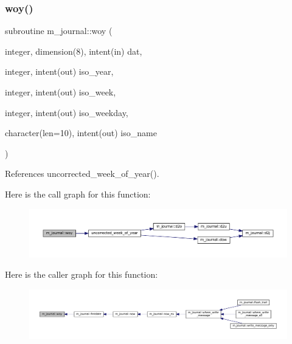 \subsubsection{\texorpdfstring{woy()}{woy()}}
{\footnotesize\ttfamily subroutine m\+\_\+journal\+::woy (\begin{DoxyParamCaption}\item[{integer, dimension(8), intent(in)}]{dat,  }\item[{integer, intent(out)}]{iso\+\_\+year,  }\item[{integer, intent(out)}]{iso\+\_\+week,  }\item[{integer, intent(out)}]{iso\+\_\+weekday,  }\item[{character(len=10), intent(out)}]{iso\+\_\+name }\end{DoxyParamCaption})\hspace{0.3cm}{\ttfamily [private]}}



References uncorrected\+\_\+week\+\_\+of\+\_\+year().

Here is the call graph for this function\+:\nopagebreak
\begin{figure}[H]
\begin{center}
\leavevmode
\includegraphics[width=350pt]{namespacem__journal_a1ee1cbb181ac428b54cd9e7acaba3be9_cgraph}
\end{center}
\end{figure}
Here is the caller graph for this function\+:\nopagebreak
\begin{figure}[H]
\begin{center}
\leavevmode
\includegraphics[width=350pt]{namespacem__journal_a1ee1cbb181ac428b54cd9e7acaba3be9_icgraph}
\end{center}
\end{figure}
\mbox{\label{namespacem__journal_aa86511a7c388f9286c282f6fa933ab58}} 
